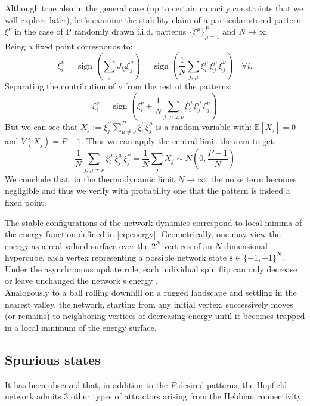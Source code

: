 \documentclass[a4paper,12pt]{report}
\begin{document}
Although true also in the general case (up to certain capacity constraints that we 
will explore later), let's examine the stability claim of a particular stored pattern 
$\xi^\nu$ in the case of P randomly drawn i.i.d. patterns $\{\xi^{\mu}\}_{\mu=1}^P$ 
and $N \to \infty$. \\
Being a fixed point corresponds to:
\begin{equation}
  \xi^\nu_i = \operatorname{sign}\left( \sum_{j}J_{ij}\xi^\nu_j \right) = 
  \operatorname{sign}\left( \frac{1}{N} \sum_{j,\, \mu} \xi_i^{\mu}\,\xi_j^{\mu}\,\xi^\nu_j \right)
   \quad \forall i.
\end{equation}
Separating the contribution of $\nu$ from the rest of the patterns:
\begin{equation}
  \xi^\nu_i = \operatorname{sign}\left(\xi_i^{\nu} + 
  \frac{1}{N} \sum_{j, \,\mu\neq\nu} \xi_i^{\mu}\,\xi_j^{\mu}\, \xi^\nu_j \right)
\end{equation}
But we can see that $X_j := \xi^\mu_j\sum_{\mu\neq\nu}^{P}\xi^\mu_i \xi^\mu_j$ is a 
random variable with: $\mathbb{E}[X_j] = 0$ and $V(X_j) = {P-1}$. Thus we can apply 
the central limit theorem to get:
\begin{equation}
\frac{1}{N} \sum_{j, \,\mu\neq\nu} \xi_i^{\mu}\,\xi_j^{\mu}\, \xi^\nu_j = 
\frac{1}{N} \sum_{j}X_j \sim N\left(0, \frac{P-1}{N}\right)
\end{equation}
We conclude that, in the thermodynamic limit $N \to \infty$, the noise term becomes 
negligible and thus we verify with probability one that the pattern is indeed a fixed 
point.

The stable configurations of the network dynamics correspond to local minima of the 
energy function defined in \eqref{eq:energy}. Geometrically, one may view the energy 
as a real-valued surface over the \(2^N\) vertices of an \(N\)-dimensional hypercube, 
each vertex representing a possible network state \(\mathbf{s}\in\{-1,+1\}^N\). 
Under the asynchronous update rule, each individual spin flip can only decrease or 
leave unchanged the network's energy \cite{Hertz2018}. \\
Analogously to a ball rolling downhill on a rugged landscape and settling in the nearest 
valley, the network, starting from any initial vertex, successively moves (or remains) 
to neighboring vertices of decreasing energy until it becomes trapped in a local 
minimum of the energy surface. 

\subsection*{Spurious states}
It has been observed that, in addition to the $P$ desired patterns, the Hopfield 
network admits 3 other types of attractors arising from the Hebbian connectivity.
\end{document}
